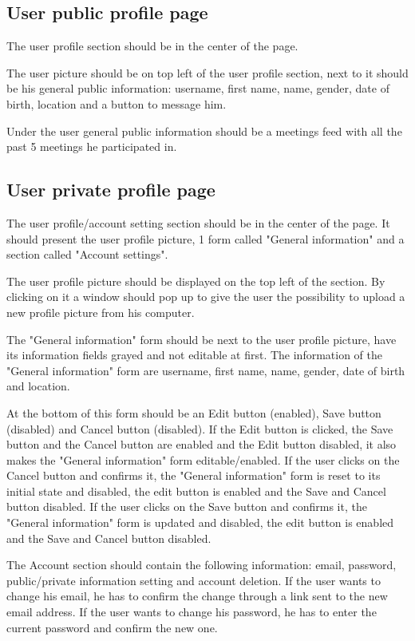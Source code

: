 \documentclass[conference]{IEEEtran}
\begin{document}
\subsection{User public profile page}

The user profile section should be in the center of the page.

The user picture should be on top left of the user profile section, next to it should be his general public information: username, first name, name, gender, date of birth, location and a button to message him.

Under the user general public information should be a meetings feed with all the past 5 meetings he participated in.

\subsection{User private profile page}

The user profile/account setting section should be in the center of the page.
It should present the user profile picture, 1 form called "General information" and a section called "Account settings".

The user profile picture should be displayed on the top left of the section. 
By clicking on it a window should pop up to give the user the possibility to upload a new profile picture from his computer.

The "General information" form should be next to the user profile picture, have its information fields grayed and not editable at first.
The information of the "General information" form are username, first name, name, gender, date of birth and location.

At the bottom of this form should be an Edit button (enabled), Save button (disabled) and Cancel button (disabled). 
If the Edit button is clicked, the Save button and the Cancel button are enabled and the Edit button disabled, it also makes the "General information" form editable/enabled.
If the user clicks on the Cancel button and confirms it, the "General information" form is reset to its initial state and disabled, the edit button is enabled and the Save and Cancel button disabled.
If the user clicks on the Save button and confirms it, the "General information" form is updated and disabled, the edit button is enabled and the Save and Cancel button disabled.

The Account section should contain the following information: email, password, public/private information setting and account deletion.
If the user wants to change his email, he has to confirm the change through a link sent to the new email address.
If the user wants to change his password, he has to enter the current password and confirm the new one.
\end{document}
